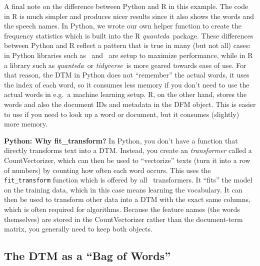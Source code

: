 A final note on the difference between Python and R in this example.
The code in R is much simpler and produces nicer results since it also shows the words and the speech names.
In Python, we wrote our own helper function to create the frequency statistics which is built into the R \emph{quanteda}\ package.
These differences between Python and R reflect a pattern that is true in many (but not all) cases:
in Python libraries such as \numpy\ and \sklearn\ are setup to maximize performance,
while in R a library such as \emph{quanteda}\ or \emph{tidyverse}\ is more geared towards ease of use.
For that reason, the DTM in Python does not ``remember'' the actual words, it uses the index of each word,
so it consumes less memory if you don't need to use the actual words in e.g.\ a machine learning setup.
R, on the other hand, stores the words and also the document IDs and metadata in the DFM object.
This is easier to use if you need to look up a word or document, but it consumes (slightly) more memory.



\begin{feature}
\noindent\textbf{Python: Why fit\_transform?}
In Python, you don't have a function that directly transforms text into a DTM.
Instead, you create an \emph{transformer} called a CountVectorizer,
which can then be used to ``vectorize'' texts (turn it into a row of numbers)
by counting how often each word occurs.
This uses the \texttt{fit\_transform} function which is offered by all \sklearn\ transformers.
It ``fits'' the model on the training data, which in this case means learning the vocabulary.
It can then be used to transform other data into a DTM with the exact same columns,
which is often required for algorithms.
Because the feature names (the words themselves) are stored in the CountVectorizer
rather than the document-term matrix, you generally need to keep both objects.
\end{feature}

\subsection{The DTM as a ``Bag of Words''}\label{sec:bagofwords}


